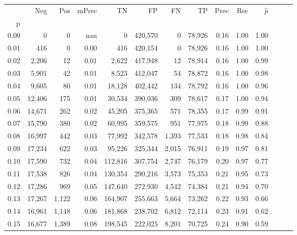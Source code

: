 \begin{tabular}{rrrrrrrrrrrrrr}
\toprule
{} &     Neg &    Pos & mPrec &       TN &       FP &      FN &      TP &  Prec &   Rec & $\hat{p}$ \\
p    &         &        &       &          &          &         &         &       &       &           \\
\midrule
0.00 &       0 &      0 &   nan &        0 &  420,570 &       0 &  78,926 &  0.16 &  1.00 &      1.00 \\
0.01 &     416 &      0 &  0.00 &      416 &  420,154 &       0 &  78,926 &  0.16 &  1.00 &      1.00 \\
0.02 &   2,206 &     12 &  0.01 &    2,622 &  417,948 &      12 &  78,914 &  0.16 &  1.00 &      0.99 \\
0.03 &   5,901 &     42 &  0.01 &    8,523 &  412,047 &      54 &  78,872 &  0.16 &  1.00 &      0.98 \\
0.04 &   9,605 &     80 &  0.01 &   18,128 &  402,442 &     134 &  78,792 &  0.16 &  1.00 &      0.96 \\
0.05 &  12,406 &    175 &  0.01 &   30,534 &  390,036 &     309 &  78,617 &  0.17 &  1.00 &      0.94 \\
0.06 &  14,671 &    262 &  0.02 &   45,205 &  375,365 &     571 &  78,355 &  0.17 &  0.99 &      0.91 \\
0.07 &  15,790 &    380 &  0.02 &   60,995 &  359,575 &     951 &  77,975 &  0.18 &  0.99 &      0.88 \\
0.08 &  16,997 &    442 &  0.03 &   77,992 &  342,578 &   1,393 &  77,533 &  0.18 &  0.98 &      0.84 \\
0.09 &  17,234 &    622 &  0.03 &   95,226 &  325,344 &   2,015 &  76,911 &  0.19 &  0.97 &      0.81 \\
0.10 &  17,590 &    732 &  0.04 &  112,816 &  307,754 &   2,747 &  76,179 &  0.20 &  0.97 &      0.77 \\
0.11 &  17,538 &    826 &  0.04 &  130,354 &  290,216 &   3,573 &  75,353 &  0.21 &  0.95 &      0.73 \\
0.12 &  17,286 &    969 &  0.05 &  147,640 &  272,930 &   4,542 &  74,384 &  0.21 &  0.94 &      0.70 \\
0.13 &  17,267 &  1,122 &  0.06 &  164,907 &  255,663 &   5,664 &  73,262 &  0.22 &  0.93 &      0.66 \\
0.14 &  16,961 &  1,148 &  0.06 &  181,868 &  238,702 &   6,812 &  72,114 &  0.23 &  0.91 &      0.62 \\
0.15 &  16,677 &  1,389 &  0.08 &  198,545 &  222,025 &   8,201 &  70,725 &  0.24 &  0.90 &      0.59 \\

\end{tabular}
